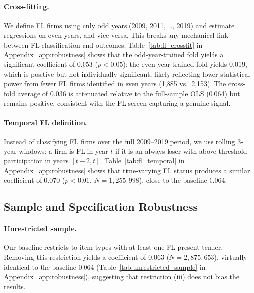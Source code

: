 \paragraph{Cross-fitting.}
We define FL firms using only odd years (2009, 2011, \ldots, 2019) and
estimate regressions on even years, and vice versa. This breaks any
mechanical link between FL classification and outcomes.
Table~\ref{tab:fl_crossfit} in Appendix~\ref{app:robustness} shows that
the odd-year-trained fold yields a significant coefficient of 0.053
($p < 0.05$); the even-year-trained fold yields 0.019, which is
positive but not individually significant, likely reflecting lower
statistical power from fewer FL firms identified in even years (1,885
vs.\ 2,153). The cross-fold average of 0.036 is attenuated relative to
the full-sample OLS (0.064) but remains positive, consistent with the
FL screen capturing a genuine signal.

\paragraph{Temporal FL definition.}
Instead of classifying FL firms over the full 2009--2019 period, we use
rolling 3-year windows: a firm is FL in year $t$ if it is an
always-loser with above-threshold participation in years $[t-2, t]$.
Table~\ref{tab:fl_temporal} in Appendix~\ref{app:robustness} shows
that time-varying FL status produces a similar coefficient of 0.070
($p < 0.01$, $N = 1{,}255{,}998$), close to the baseline 0.064.

\subsection{Sample and Specification Robustness}

\paragraph{Unrestricted sample.}
Our baseline restricts to item types with at least one FL-present
tender. Removing this restriction yields a coefficient of 0.063 ($N =
2{,}875{,}653$), virtually identical to the baseline 0.064
(Table~\ref{tab:unrestricted_sample} in Appendix~\ref{app:robustness}),
suggesting that restriction (iii) does not bias the results.

